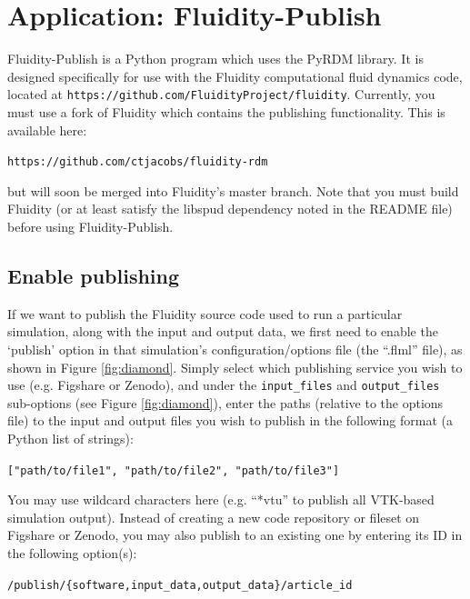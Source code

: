 \documentclass[a4paper,11pt]{report}
\begin{document}
\chapter{Application: Fluidity-Publish}
Fluidity-Publish is a Python program which uses the PyRDM library. It is designed specifically for use with the Fluidity computational fluid dynamics code, located at \texttt{https://github.com/FluidityProject/fluidity}. Currently, you must use a fork of Fluidity which contains the publishing functionality. This is available here:

\texttt{https://github.com/ctjacobs/fluidity-rdm}

but will soon be merged into Fluidity's master branch. Note that you must build Fluidity (or at least satisfy the libspud dependency noted in the README file) before using Fluidity-Publish.

\section{Enable publishing}
If we want to publish the Fluidity source code used to run a particular simulation, along with the input and output data, we first need to enable the `publish' option in that simulation's configuration/options file (the ``.flml'' file), as shown in Figure \ref{fig:diamond}. Simply select which publishing service you wish to use (e.g. Figshare or Zenodo), and under the \texttt{input\_files} and \texttt{output\_files} sub-options (see Figure \ref{fig:diamond}), enter the paths (relative to the options file) to the input and output files you wish to publish in the following format (a Python list of strings): 

\texttt{["path/to/file1", "path/to/file2", "path/to/file3"]}

You may use wildcard characters here (e.g. ``*vtu'' to publish all VTK-based simulation output). Instead of creating a new code repository or fileset on Figshare or Zenodo, you may also publish to an existing one by entering its ID in the following option(s):

\texttt{/publish/\{software,input\_data,output\_data\}/article\_id}
\end{document}

